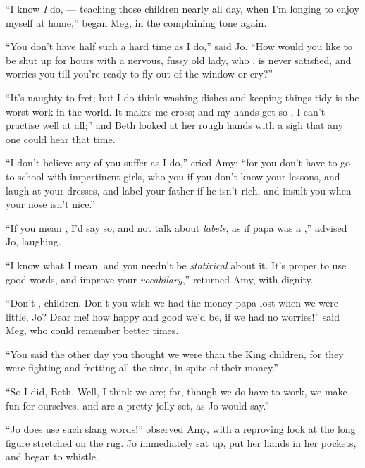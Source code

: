 \documentclass{fiche}
\begin{document}
\begin{texte}
``I know \emph{I} do, --- teaching those  children
nearly all day, when I'm longing to enjoy myself at home,'' began Meg, in the complaining
tone again.

``You don't have half such a hard time as I do,'' said Jo. ``How would you like to be shut up
for hours with a nervous, fussy old lady, who , is never satisfied, and worries you till
you're ready to fly out of the window or cry?''

``It's naughty to fret; but I do think washing dishes and keeping things tidy is the worst
work in the world. It makes me cross; and my hands get so , I can't practise well at all;'' and Beth looked at her rough hands with a sigh
that any one could hear that time.

``I don't believe any of you suffer as I do,'' cried Amy; ``for you don't have to go to
school with impertinent girls, who  you if
you don't know your lessons, and laugh at your dresses, and label your father if he isn't
rich, and insult you when your nose isn't nice.''

``If you mean , I'd say so, and not talk about \emph{labels}, as if papa was a
,'' advised Jo, laughing.

``I know what I mean, and you needn't be \emph{statirical} about it. It's proper to use good
words, and improve your \emph{vocabilary},'' returned Amy, with dignity.

``Don't , children. Don't you wish we had the money papa lost when we were little, Jo?
Dear me! how happy and good we'd be, if we had no worries!'' said Meg, who could remember
better times.

``You said the other day you thought we were  than the King children, for they were fighting and fretting all the
time, in spite of their money.''

``So I did, Beth. Well, I think we are; for, though we do have to work, we make fun for
ourselves, and are a pretty jolly set, as Jo would say.''

``Jo does use such slang words!'' observed Amy, with a reproving look at the long figure
stretched on the rug. Jo immediately sat up, put her hands in her pockets, and began to
whistle.


\end{texte}
\end{document}
